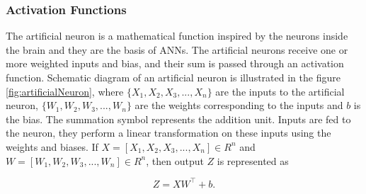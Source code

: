 \subsubsection{Activation Functions}



The artificial neuron is a mathematical function inspired by the neurons inside the brain and they are the basis of \acp{ANN}. The artificial neurons receive one or more weighted inputs and bias, and their sum is passed through an activation function. Schematic diagram of an artificial neuron is illustrated in the figure \ref{fig:artificialNeuron}, where $\{X_1, X_2, X_3, ..., X_n\}$ are the inputs to the artificial neuron, $\{W_1, W_2, W_3, ..., W_n\}$ are the weights corresponding to the inputs and $b$ is the bias. The summation symbol represents the addition unit. Inputs are fed to the neuron, they perform a linear transformation on these inputs using the weights and biases. If $X = [X_1, X_2, X_3, ..., X_n]  \in R^{n}$  and  $W = [W_1, W_2, W_3, ..., W_n] \in R^{n}$, then output $Z$ is represented as

\begin{equation}\label{linearRegression}
Z=X{W}^\intercal + b.
\end{equation}

